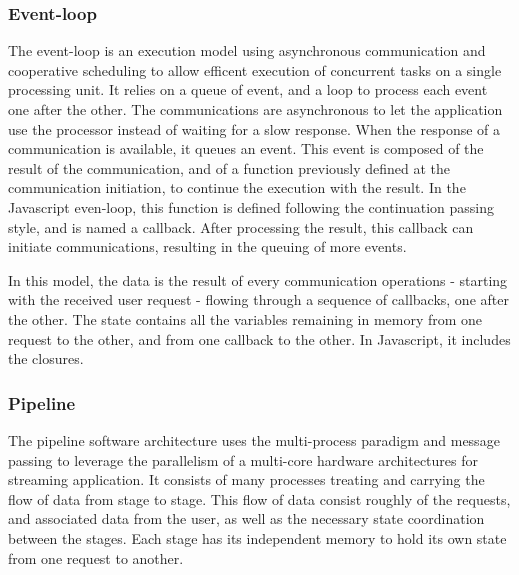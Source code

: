 \subsubsection{Event-loop}

The event-loop is an execution model using asynchronous communication and cooperative scheduling to allow efficent execution of concurrent tasks on a single processing unit.
It relies on a queue of event, and a loop to process each event one after the other.
The communications are asynchronous to let the application use the processor instead of waiting for a slow response.
When the response of a communication is available, it queues an event.
This event is composed of the result of the communication, and of a function previously defined at the communication initiation, to continue the execution with the result.
In the Javascript even-loop, this function is defined following the continuation passing style, and is named a callback.
After processing the result, this callback can initiate communications, resulting in the queuing of more events.

In this model, the data is the result of every communication operations - starting with the received user request - flowing through a sequence of callbacks, one after the other.
The state contains all the variables remaining in memory from one request to the other, and from one callback to the other.
In Javascript, it includes the closures.


\subsubsection{Pipeline}

The pipeline software architecture uses the multi-process paradigm and message passing to leverage the parallelism of a multi-core hardware architectures for streaming application.
It consists of many processes treating and carrying the flow of data from stage to stage.
This flow of data consist roughly of the requests, and associated data from the user, as well as the necessary state coordination between the stages.
Each stage has its independent memory to hold its own state from one request to another.


